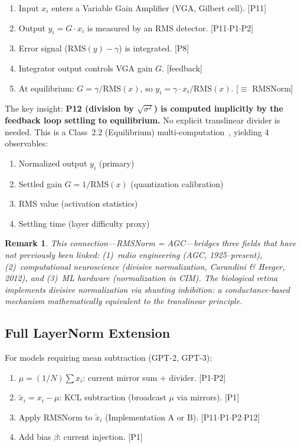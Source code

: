 \documentclass[11pt]{article}
\newtheorem{remark}{Remark}
\begin{document}
\begin{enumerate}[leftmargin=*]
\item Input $x_i$ enters a Variable Gain Amplifier (VGA, Gilbert cell). \hfill [P11]
\item Output $y_i = G \cdot x_i$ is measured by an RMS detector. \hfill [P11$\cdot$P1$\cdot$P2]
\item Error signal ($\text{RMS}(y) - \gamma$) is integrated. \hfill [P8]
\item Integrator output controls VGA gain $G$. \hfill [feedback]
\item At equilibrium: $G = \gamma / \text{RMS}(x)$, so $y_i = \gamma \cdot x_i / \text{RMS}(x)$. \hfill [$\equiv$ RMSNorm]
\end{enumerate}

The key insight: \textbf{P12 (division by $\sqrt{\sigma^2}$) is computed implicitly by the feedback loop settling to equilibrium.} No explicit translinear divider is needed. This is a Class~2.2 (Equilibrium) multi-computation~\cite{bieg2026}, yielding 4 observables:
\begin{enumerate}
\item Normalized output $y_i$ (primary)
\item Settled gain $G = 1/\text{RMS}(x)$ (quantization calibration)
\item RMS value (activation statistics)
\item Settling time (layer difficulty proxy)
\end{enumerate}

\begin{remark}
This connection---RMSNorm = AGC---bridges three fields that have not previously been linked: (1)~radio engineering (AGC, 1925--present), (2)~computational neuroscience (divisive normalization, Carandini \& Heeger, 2012), and (3)~ML hardware (normalization in CIM). The biological retina implements divisive normalization via shunting inhibition: a conductance-based mechanism mathematically equivalent to the translinear principle.
\end{remark}

\subsection{Full LayerNorm Extension}

For models requiring mean subtraction (GPT-2, GPT-3):
\begin{enumerate}[leftmargin=*]
\item $\mu = (1/N)\sum x_i$: current mirror sum + divider. \hfill [P1$\cdot$P2]
\item $\tilde{x}_i = x_i - \mu$: KCL subtraction (broadcast $\mu$ via mirrors). \hfill [P1]
\item Apply RMSNorm to $\tilde{x}_i$ (Implementation A or B). \hfill [P11$\cdot$P1$\cdot$P2$\cdot$P12]
\item Add bias $\beta$: current injection. \hfill [P1]
\end{enumerate}
\end{document}
